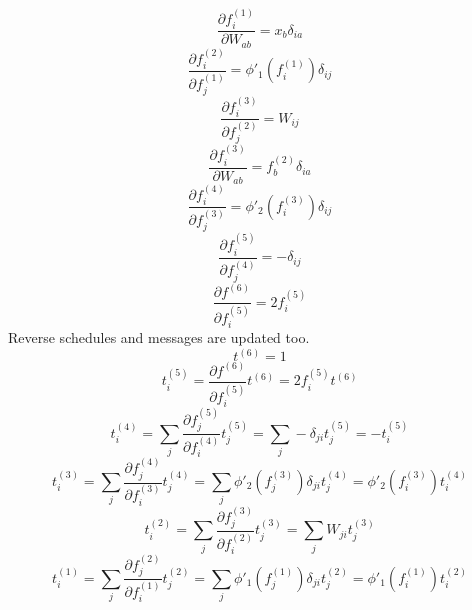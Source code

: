 \documentclass[fleqn]{report}
\begin{document}
\begin{equation}
    \frac{\partial f^{(1)}_i}{\partial W_{ab}} = x_b \delta_{ia}
\end{equation}
\begin{equation}
    \frac{\partial f^{(2)}_i}{\partial f^{(1)}_j} = \phi'_1 \left ( f^{(1)}_i \right ) \delta_{ij}
\end{equation}
\begin{equation}
    \frac{\partial f^{(3)}_i}{\partial f^{(2)}_j} = W_{ij}
\end{equation}
\begin{equation}
    \frac{\partial f^{(3)}_i}{\partial W_{ab}} = f^{(2)}_b \delta_{ia}
\end{equation}
\begin{equation}
    \frac{\partial f^{(4)}_i}{\partial f^{(3)}_j} = \phi'_2 \left ( f^{(3)}_i \right ) \delta_{ij}
\end{equation}
\begin{equation}
    \frac{\partial f^{(5)}_i}{\partial f^{(4)}_j} = - \delta_{ij}
\end{equation}
\begin{equation}
    \frac{\partial f^{(6)}}{\partial f^{(5)}_i} = 2 f^{(5)}_i
\end{equation}
Reverse schedules and messages are updated too.
\begin{equation}
    t^{(6)} = 1
\end{equation}
\begin{equation}
    t^{(5)}_i = \frac{\partial f^{(6)}}{\partial f^{(5)}_i} t^{(6)} = 2 f^{(5)}_i t^{(6)}
\end{equation}
\begin{equation}
    t^{(4)}_i = \sum_j \frac{\partial f^{(5)}_j}{\partial f^{(4)}_i} t^{(5)}_j = \sum_j - \delta_{ji} t^{(5)}_j = - t^{(5)}_i
\end{equation}
\begin{equation}
    t^{(3)}_i = \sum_j \frac{\partial f^{(4)}_j}{\partial f^{(3)}_i} t^{(4)}_j = \sum_j \phi'_2 \left ( f^{(3)}_j \right ) \delta_{ji} t^{(4)}_j = \phi'_2 \left ( f^{(3)}_i \right ) t^{(4)}_i
\end{equation}
\begin{equation}
    t^{(2)}_i = \sum_j \frac{\partial f^{(3)}_j}{\partial f^{(2)}_i} t^{(3)}_j = \sum_j W_{ji} t^{(3)}_j
\end{equation}
\begin{equation}
    t^{(1)}_i = \sum_j \frac{\partial f^{(2)}_j}{\partial f^{(1)}_i} t^{(2)}_j = \sum_j \phi'_1 \left ( f^{(1)}_j \right ) \delta_{ji} t^{(2)}_j = \phi'_1 \left ( f^{(1)}_i \right ) t^{(2)}_i
\end{equation}
\end{document}
